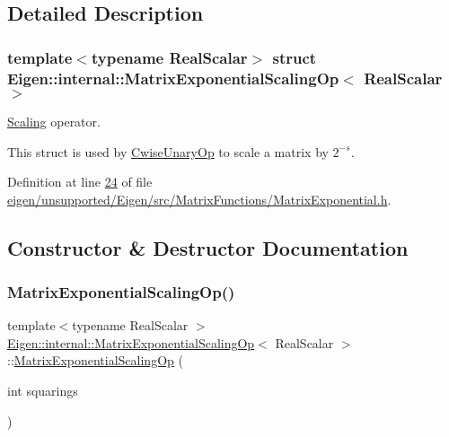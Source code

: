 \subsection{Detailed Description}
\subsubsection*{template$<$typename Real\+Scalar$>$\newline
struct Eigen\+::internal\+::\+Matrix\+Exponential\+Scaling\+Op$<$ Real\+Scalar $>$}

\hyperlink{class_scaling}{Scaling} operator. 

This struct is used by \hyperlink{group___core___module_class_eigen_1_1_cwise_unary_op}{Cwise\+Unary\+Op} to scale a matrix by $ 2^{-s} $. 

Definition at line \hyperlink{eigen_2unsupported_2_eigen_2src_2_matrix_functions_2_matrix_exponential_8h_source_l00024}{24} of file \hyperlink{eigen_2unsupported_2_eigen_2src_2_matrix_functions_2_matrix_exponential_8h_source}{eigen/unsupported/\+Eigen/src/\+Matrix\+Functions/\+Matrix\+Exponential.\+h}.



\subsection{Constructor \& Destructor Documentation}
\mbox{\label{struct_eigen_1_1internal_1_1_matrix_exponential_scaling_op_afb0f3ee7d324e315d1e1233f70110438}} 
\subsubsection{\texorpdfstring{Matrix\+Exponential\+Scaling\+Op()}{MatrixExponentialScalingOp()}\hspace{0.1cm}{\footnotesize\ttfamily [1/2]}}
{\footnotesize\ttfamily template$<$typename Real\+Scalar $>$ \\
\hyperlink{struct_eigen_1_1internal_1_1_matrix_exponential_scaling_op}{Eigen\+::internal\+::\+Matrix\+Exponential\+Scaling\+Op}$<$ Real\+Scalar $>$\+::\hyperlink{struct_eigen_1_1internal_1_1_matrix_exponential_scaling_op}{Matrix\+Exponential\+Scaling\+Op} (\begin{DoxyParamCaption}\item[{int}]{squarings }\end{DoxyParamCaption})\hspace{0.3cm}{\ttfamily [inline]}}



